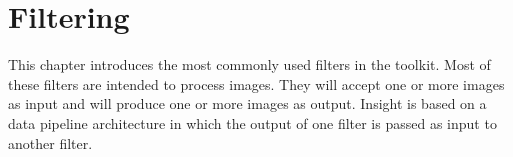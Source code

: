 \chapter{Filtering}

This chapter introduces the most commonly used filters in the toolkit.  Most of
these filters are intended to process images. They will accept one or more
images as input and will produce one or more images as output. Insight is based
on a data pipeline architecture in which the output of one filter is passed as
input to another filter.


%
%
%
%
%
%
%
%
%
%
%
%
%
%
%
%
%
%

